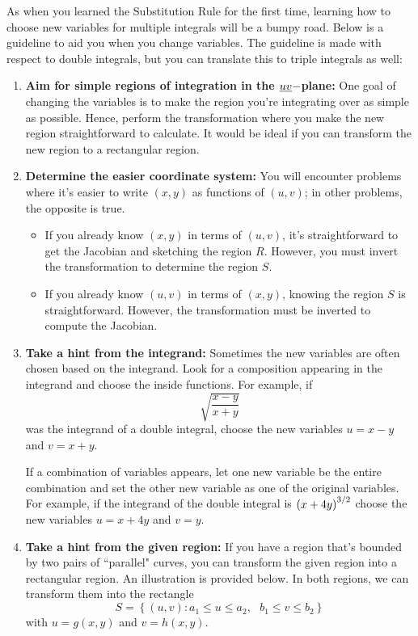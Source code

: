 \documentclass[../mathNotesPreamble]{subfiles}
\begin{document}
  \noindent
  As when you learned the Substitution Rule for the first time, learning how to choose new variables for multiple integrals will be a bumpy road. Below is a guideline to aid you when you change variables. The guideline is made with respect to double integrals, but you can translate this to triple integrals as well:
  \begin{enumerate}
    \item\textbf{Aim for simple regions of integration in the $\emph{uv}-$plane:} One goal of changing the variables is to make the region you're integrating over as simple as possible. Hence, perform the transformation where  you make the new region straightforward to calculate. It would be ideal if you can transform the new region to a rectangular region.

    \item\textbf{Determine the easier coordinate system:} You will encounter problems where it's easier to write $(x,y)$ as functions of $(u,v)$; in other problems, the opposite is true. 
      \begin{itemize}
        \item If you already know $(x,y)$ in terms of $(u,v)$, it's straightforward to get the Jacobian and sketching the region $R$. However, you must invert the transformation to determine the region $S$.

        \item  If you already know $(u,v)$ in terms of $(x,y)$, knowing the region $S$ is straightforward. However, the transformation must be inverted to compute the Jacobian.
        \end{itemize} 
      \item\textbf{Take a hint from the integrand:} Sometimes the new variables are often chosen based on the integrand. Look for a composition appearing in the integrand and choose the inside functions. For example, if
        \[
          \sqrt{\dfrac{x-y}{x+y}}
        \]
        was the integrand of a double integral, choose the new variables $u=x-y$ and $v=x+y$.
        \vspace*{\baselineskip}

        If a combination of variables appears, let one new variable be the entire combination and set the other new variable as one of the original variables. For example, if the integrand of the double integral is ${\left(x+4y\right)}^{3/2}$ choose the new variables $u=x+4y$ and $v=y$.

      \item\textbf{Take a hint from the given  region:} If you have a region that's bounded by two pairs of ``parallel" curves, you can transform the given region into a rectangular region. An illustration is provided below. In both regions, we can  transform them into the rectangle 
        \[
          S=\left\{(u,v):a_1\leq u\leq a_2,\text{ }b_1\leq v\leq b_2\right\}
        \]
        with $u=g(x,y)$ and $v=h(x,y).$
      \end{enumerate}
\end{document}
